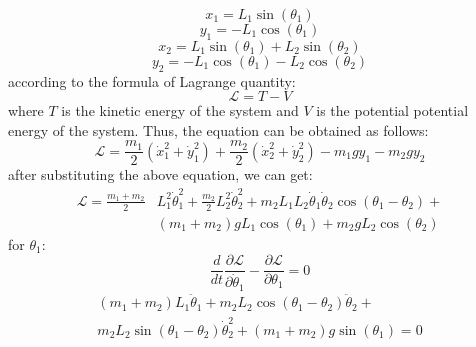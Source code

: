 \documentclass[11pt,a4paper]{article}
\begin{document}
\begin{equation}
x_{1}=L_{1} \sin \left(\theta_{1}\right)
\end{equation}
\begin{equation}
y_{1}=-L_{1} \cos \left(\theta_{1}\right)
\end{equation}
\begin{equation}
x_{2}=L_{1} \sin \left(\theta_{1}\right)+L_{2} \sin \left(\theta_{2}\right)
\end{equation}
\begin{equation}
y_{2}=-L_{1} \cos \left(\theta_{1}\right)-L_{2} \cos \left(\theta_{2}\right)
\end{equation}
according to the formula of Lagrange quantity:
\begin{equation}
\mathcal{L}=T-V
\end{equation}
where $T$ is the kinetic energy of the system and $V$ is the potential potential energy of the system. Thus, the equation can be obtained as follows:
\begin{equation}
\mathcal{L}=\frac{m_{1}}{2}\left(\dot{x}_{1}^{2}+\dot{y}_{1}^{2}\right)+\frac{m_{2}}{2}\left(\dot{x}_{2}^{2}+\dot{y}_{2}^{2}\right)-m_{1} g y_{1}-m_{2} g y_{2}
\end{equation}
after substituting the above equation, we can get:
\begin{equation}
\begin{aligned} \mathcal{L}=\frac{m_{1}+m_{2}}{2} & L_{1}^{2} \dot{\theta}_{1}^{2}+\frac{m_{2}}{2} L_{2}^{2} \dot{\theta}_{2}^{2}+m_{2} L_{1} L_{2} \dot{\theta}_{1} \dot{\theta}_{2} \cos \left(\theta_{1}-\theta_{2}\right)+\\ &\left(m_{1}+m_{2}\right) g L_{1} \cos \left(\theta_{1}\right)+m_{2} g L_{2} \cos \left(\theta_{2}\right) \end{aligned}
\end{equation}
for $\theta_{1}$:
\begin{equation}
\frac{d}{d t} \frac{\partial \mathcal{L}}{\partial \dot{\theta}_{1}}-\frac{\partial \mathcal{L}}{\partial \theta_{1}}=0
\end{equation}
\begin{equation}
\begin{aligned} \left(m_{1}+m_{2}\right) L_{1} \ddot{\theta}_{1}+m_{2} L_{2} \cos \left(\theta_{1}-\theta_{2}\right) \ddot{\theta}_{2}+\\
m_{2} L_{2} \sin \left(\theta_{1}-\theta_{2}\right) \dot{\theta}_{2}^{2}+\left(m_{1}+m_{2}\right) g \sin \left(\theta_{1}\right)=0 \end{aligned}
\end{equation}
\end{document}
